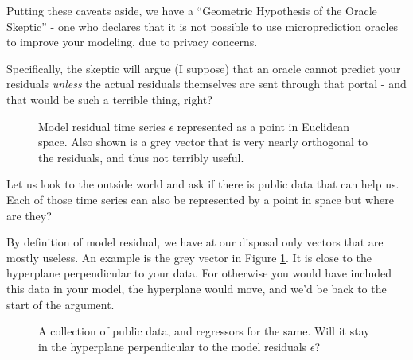 Putting these caveats aside, we have a ``Geometric Hypothesis of the Oracle Skeptic'' - one who declares that it is not possible to use microprediction oracles to improve your modeling, due to privacy concerns. 


Specifically, the skeptic will argue (I suppose) that an oracle cannot predict your residuals {\em unless} the actual residuals themselves are sent through that portal  - and that would be such a terrible thing, right? 

\begin{figure} 

\iftikz 
{}
\else 
\fi 
\caption{Model residual time series $\epsilon$ represented as a point in Euclidean space. Also shown is a grey vector that is very nearly orthogonal to the residuals, and thus not terribly useful.}
\label{fig:residual}
\end{figure}

Let us look to the outside world and ask if there is public data that can help us. Each of those time series can also be represented by a point in space but where are they? 


By definition of model residual, we have at our disposal only vectors that are mostly useless. An example is the grey vector in Figure \ref{fig:residual}. It is close to the hyperplane perpendicular to your data. For otherwise you would have included this data in your model, the hyperplane would move, and we'd be back to the start of the argument. 

\begin{figure} 
\caption{A collection of public data, and regressors for the same. Will it stay in the hyperplane perpendicular to the model residuals $\epsilon$?}
\label{fig:residual2}
\end{figure}

